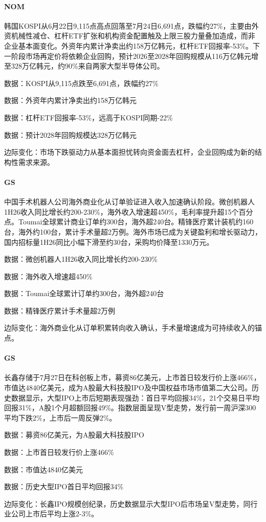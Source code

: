\documentclass[11pt]{ctexart}
\begin{document}
\paragraph{NOM} 韩国KOSPI从6月22日9,115点高点回落至7月24日6,691点，跌幅约27\%，主要由外资机械性减仓、杠杆ETF扩张和机构资金配置触及上限三股力量叠加造成，而非企业基本面变化。外资年内累计净卖出约158万亿韩元，杠杆ETF回报率-53\%。下一阶段市场再定价将依赖企业回购，预计2026至2028年回购规模从116万亿韩元增至328万亿韩元，约90\%来自两家大型半导体公司。
{\small\color{refgray}数据：KOSPI从9,115点跌至6,691点，跌幅约27\%\par}
{\small\color{refgray}数据：外资年内累计净卖出约158万亿韩元\par}
{\small\color{refgray}数据：杠杆ETF回报率-53\%，远高于KOSPI同期-22\%\par}
{\small\color{refgray}数据：预计2028年回购规模达328万亿韩元\par}
{\small\color{refgray}边际变化：市场下跌驱动力从基本面担忧转向资金面去杠杆，企业回购成为新的结构性需求来源。\par}
\paragraph{GS} 中国手术机器人公司海外商业化从订单验证进入收入加速确认阶段。微创机器人1H26收入同比增长约200-230\%，海外收入增速超450\%，毛利率提升超15个百分点。Toumai全球累计商业订单约300台，海外超240台。精锋医疗累计装机约160台，海外约100台，累计手术量超2万例。海外市场已成为关键盈利和增长驱动力，国内招标量1H26同比小幅下滑至约30台，采购均价降至1330万元。
{\small\color{refgray}数据：微创机器人1H26收入同比增长约200-230\%\par}
{\small\color{refgray}数据：海外收入增速超450\%\par}
{\small\color{refgray}数据：Toumai全球累计订单约300台，海外超240台\par}
{\small\color{refgray}数据：精锋医疗累计手术量超2万例\par}
{\small\color{refgray}边际变化：海外商业化从订单积累转向收入确认，手术量增速成为可持续收入的锚点。\par}
\paragraph{GS} 长鑫存储于7月27日在科创板上市，募资86亿美元，上市首日较发行价上涨466\%，市值达4840亿美元，成为A股最大科技股IPO及中国权益市场市值第二大公司。历史数据显示，大型IPO上市后短期表现强劲：首日平均回报34\%，21个交易日平均回报31\%，A股1个月超额回报49\%。指数层面呈现V型走势，发行前一周沪深300平均下跌2\%，上市后一周反弹2\%。
{\small\color{refgray}数据：募资86亿美元，为A股最大科技股IPO\par}
{\small\color{refgray}数据：上市首日较发行价上涨466\%\par}
{\small\color{refgray}数据：市值达4840亿美元\par}
{\small\color{refgray}数据：历史大型IPO首日平均回报34\%\par}
{\small\color{refgray}边际变化：长鑫IPO规模创纪录，历史数据显示大型IPO后市场呈V型走势，同行业公司上市后平均上涨2-3\%。\par}
\end{document}
